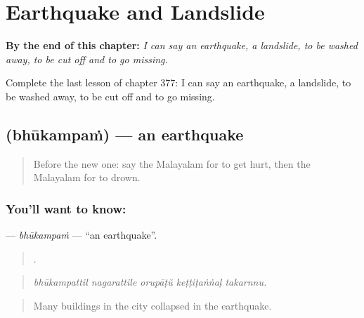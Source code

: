 
\chapter{Earthquake and Landslide}
\label{ch:ml-earthquake-and-landslide}

\begin{chapteropening}
\textbf{By the end of this chapter:} \emph{I can say an earthquake, a landslide, to be washed away, to be cut off and to go missing.}

Complete the last lesson of chapter 377: I can say an earthquake, a landslide, to be washed away, to be cut off and to go missing.
\end{chapteropening}

\section[\texorpdfstring{\ml{ഭൂകമ്പം} (bhūkampaṁ)}{ഭൂകമ്പം (bhūkampaṁ)}]{ (bhūkampaṁ) — an earthquake}

\label{lesson:ML-C377-bhukampam}



\begin{quote}
Before the new one: say the Malayalam for to get hurt, then the Malayalam for to drown.
\end{quote}

\subsection*{You'll want to know: }
\textbf{} — \emph{bhūkampaṁ} — \textquotedblleft{}an earthquake\textquotedblright{}.

\begin{quote}
    .
\end{quote}

\begin{quote}
\emph{bhūkampattil nagarattile orupāṭŭ keṭṭiṭaṅṅaḷ takarnnu.}
\end{quote}

\begin{quote}
Many buildings in the city collapsed in the earthquake.
\end{quote}

